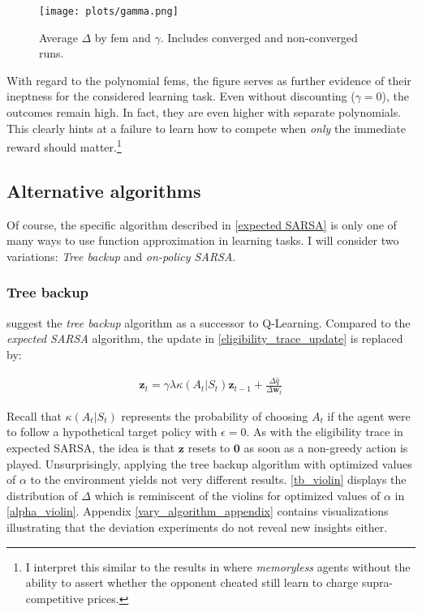 \begin{figure}
	\texttt{[image: plots/gamma.png]}
	\caption[Average $\Delta$ by \gls{fem} and $\gamma$]{Average $\Delta$ by \gls{fem} and $\gamma$. Includes converged and non-converged runs.}
	\label{gamma}
\end{figure}

With regard to the polynomial \gls{fem}s, the figure serves as further evidence of their ineptness for the considered learning task. Even without discounting ($\gamma = 0$), the outcomes remain high. In fact, they are even higher with separate polynomials. This clearly hints at a failure to learn how to compete when \emph{only} the immediate reward should matter.\footnote{I interpret this similar to the results in \textcite{waltman_q-learning_2008} where \emph{memoryless} agents without the ability to assert whether the opponent cheated still learn to charge supra-competitive prices.}

\subsection{Alternative algorithms}\label{vary_algorithm}

Of course, the specific algorithm described in \autoref{expected SARSA} is only one of many ways to use function approximation in learning tasks. I will consider two variations: \emph{Tree backup} and \emph{on-policy SARSA}.

\subsubsection{Tree backup}\label{tree_backup}

\textcite{precup_eligibility_2000} suggest the \emph{tree backup} algorithm as a successor to Q-Learning. Compared to the \emph{expected SARSA} algorithm, the update in \autoref{eligibility_trace_update} is replaced by:

\begin{gather}\label{eligibility_traces_tree_backup}
\boldsymbol{z}_t = \gamma \lambda \kappa(A_t | S_t) \boldsymbol{z}_{t-1} + \frac{\Delta \hat{q}}{\Delta \boldsymbol{w}_t}
\end{gather}

Recall that $\kappa(A_t | S_t)$ represents the probability of choosing $A_t$ if the agent were to follow a hypothetical target policy with $\epsilon= 0$. As with the eligibility trace in expected SARSA, the idea is that $\boldsymbol{z}$ resets to $\boldsymbol{0}$ as soon as a non-greedy action is played. Unsurprisingly, applying the tree backup algorithm with optimized values of $\alpha$ to the environment yields not very different results. \autoref{tb_violin} displays the distribution of $\Delta$ which is reminiscent of the violins for optimized values of $\alpha$ in \autoref{alpha_violin}. Appendix \ref{vary_algorithm_appendix} contains visualizations illustrating that the deviation experiments do not reveal new insights either.

